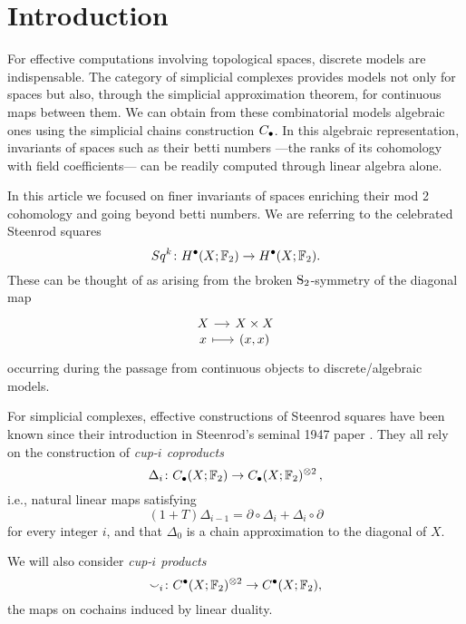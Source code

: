 
\section{Introduction}

For effective computations involving topological spaces, discrete models are indispensable.
The category of simplicial complexes provides models not only for spaces but also, through the simplicial approximation theorem, for continuous maps between them.
We can obtain from these combinatorial models algebraic ones using the simplicial chains construction $\chains$.
In this algebraic representation, invariants of spaces such as their betti numbers ---the ranks of its cohomology with field coefficients--- can be readily computed through linear algebra alone.

In this article we focused on finer invariants of spaces enriching their mod 2 cohomology and going beyond betti numbers.
We are referring to the celebrated Steenrod squares
\begin{equation*}
Sq^k \colon H^\bullet(X; \F_2) \to H^\bullet(X; \F_2).
\end{equation*}
These can be thought of as arising from the broken $\S_2$-symmetry of the diagonal map
\begin{equation*}
\begin{tikzcd}[column sep=small, row sep=-3pt]
X \arrow[r] & X \times X \\
x \arrow[r, mapsto] & (x,x)
\end{tikzcd}
\end{equation*}
occurring during the passage from continuous objects to discrete/algebraic models.

For simplicial complexes, effective constructions of Steenrod squares have been known since their introduction in Steenrod's seminal 1947 paper \cite{steenrod47}.
They all rely on the construction of \textit{cup-$i$ coproducts}
\begin{equation*}
\Delta_i \colon \chains(X; \F_2)  \to \chains(X; \F_2)^{\otimes 2}\,,
\end{equation*}
i.e., natural linear maps satisfying
\begin{equation} \label{e:boundary of cup-i}
(1 + T) \Delta_{i-1} = \partial \circ \Delta_i + \Delta_i \circ \partial
\end{equation}
for every integer $i$, and that $\Delta_0$ is a chain approximation to the diagonal of $X$.

We will also consider \textit{cup-$i$ products}
\begin{equation*}
\smallsmile_i \colon \cochains(X; \F_2)^{\otimes 2} \to \cochains(X; \F_2),
\end{equation*}
the maps on cochains induced by linear duality.

